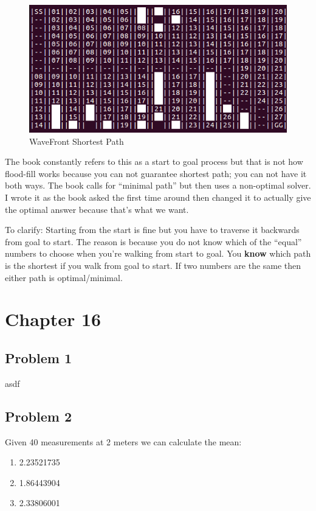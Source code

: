 \documentclass{article}
\begin{document}
\begin{figure}[h]
    \centering
    \includegraphics[scale=2.5]{problem11_3_2}
    \caption{WaveFront Shortest Path}
    \label{fig:p11_3_2}
\end{figure}

The book constantly refers to this as a start to goal process but that is not 
how flood-fill works because you can not guarantee shortest path; you can not 
have it both ways. The book calls for ``minimal path'' but then uses a 
non-optimal solver. I wrote it as the book asked the first time around then 
changed it to actually give the optimal answer because that's what we want.

To clarify: Starting from the start is fine but you have to traverse it 
backwards from goal to start. The reason is because you do not know which of the 
``equal'' numbers to choose when you're walking from start to goal. You 
\textbf{know} which path is the shortest if you walk from goal to start. If two 
numbers are the same then either path is optimal/minimal.

\newpage
\section{\textbf{Chapter 16}}
\subsection{Problem 1}
asdf

\subsection{Problem 2}
Given 40 measurements at 2 meters we can calculate the mean:

\begin{enumerate}[label=\Alph*]
    \item 2.23521735
    \item 1.86443904
    \item 2.33806001
\end{enumerate}
\end{document}
